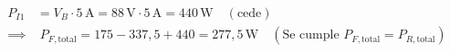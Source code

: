 \begin{ejercicio}
\begin{enumerate}
\begin{itemize}
\begin{align*}
            P_{I1} &= V_B \cdot 5\,\si{\ampere} = 88\,\si{\volt}\cdot 5\,\si{\ampere} = 440\,\si{\watt} \quad (\text{cede}) \\
            \implies &\; \boxed{P_{F,\text{total}} = 175 - 337{,}5 + 440 = 277{,}5\,\si{\watt}} \quad (\text{Se cumple } P_{F,\text{total}} = P_{R,\text{total}})
        \end{align*}
    \end{itemize}
\end{enumerate}
\end{ejercicio}
